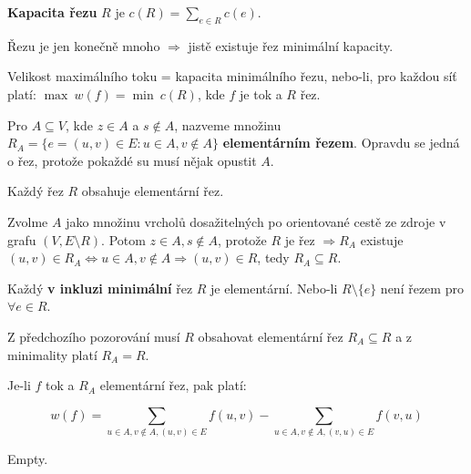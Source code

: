 \begin{definice}
	\textbf{Kapacita řezu} $R$ je $c(R) = \sum_{e \in R}c(e)$.
\end{definice}

Řezu je jen konečně mnoho $\Rightarrow$ jistě existuje řez minimální kapacity.

\begin{veta}
	Velikost maximálního toku = kapacita minimálního řezu, nebo-li, pro každou síť platí: $\max \ w(f) = \min \ c(R)$, kde $f$ je tok a $R$ řez.
\end{veta}

\begin{definice}
	Pro $A \subseteq V$, kde $z \in A$ a $s \notin A$, nazveme množinu $R_A = \{ e = (u,v) \in E: u \in A, v \notin A\}$ \textbf{elementárním řezem}. Opravdu se jedná o řez, protože pokaždé su musí nějak opustit $A$.
\end{definice}

\begin{pozor}
	Každý řez $R$ obsahuje elementární řez.
\end{pozor}

\begin{dukaz}
	Zvolme $A$ jako množinu vrcholů dosažitelných po orientované cestě ze zdroje v grafu $(V, E \setminus R)$. Potom $z \in A, s \notin A$, protože $R$ je řez $\Rightarrow R_A$ existuje $(u,v) \in R_A \Leftrightarrow u \in A, v \notin A \Rightarrow (u,v) \in R$, tedy $R_A \subseteq R$.
\end{dukaz}

\begin{pozor}
	Každý \textbf{v inkluzi minimální} řez $R$ je elementární. Nebo-li $R \setminus \{ e \}$ není řezem pro $\forall e \in R$.
\end{pozor}

\begin{dukaz}
	Z předchozího pozorování musí $R$ obsahovat elementární řez $R_A \subseteq R$ a z minimality platí $R_A = R$.
\end{dukaz}

\begin{lemma}
	Je-li $f$ tok a $R_A$ elementární řez, pak platí:
	
	$$
	w(f) = \sum_{u \in A, v \notin A, (u,v) \in E}f(u,v) - \sum_{u \in A, v \notin A, (v, u) \in E} f(v,u)
	$$
\end{lemma}

\begin{dukaz}
	Empty.
\end{dukaz}

